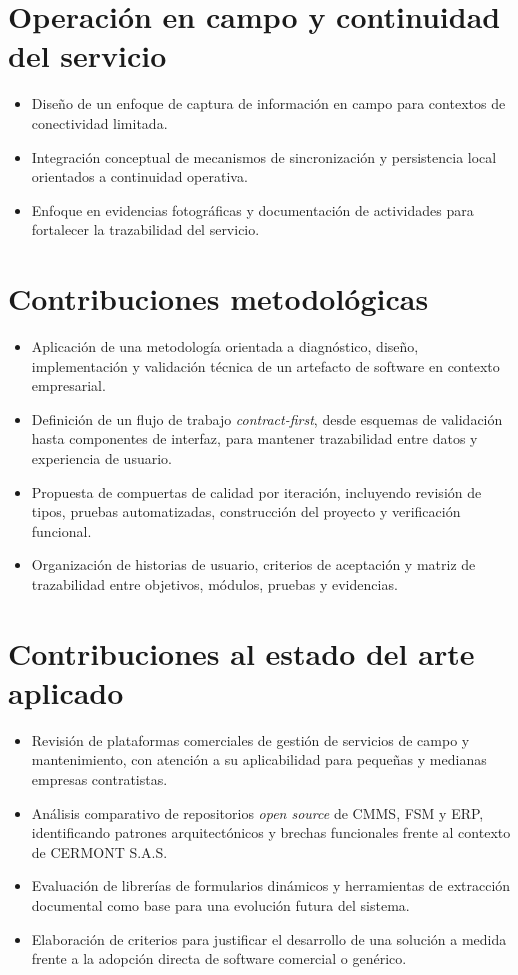 \section*{Operación en campo y continuidad del servicio}
\begin{itemize}
  \item Diseño de un enfoque de captura de información en campo para contextos de conectividad limitada.
  \item Integración conceptual de mecanismos de sincronización y persistencia local orientados a continuidad operativa.
  \item Enfoque en evidencias fotográficas y documentación de actividades para fortalecer la trazabilidad del servicio.
\end{itemize}

\section*{Contribuciones metodológicas}
\begin{itemize}
  \item Aplicación de una metodología orientada a diagnóstico, diseño, implementación y validación técnica de un artefacto de software en contexto empresarial.
  \item Definición de un flujo de trabajo \textit{contract-first}, desde esquemas de validación hasta componentes de interfaz, para mantener trazabilidad entre datos y experiencia de usuario.
  \item Propuesta de compuertas de calidad por iteración, incluyendo revisión de tipos, pruebas automatizadas, construcción del proyecto y verificación funcional.
  \item Organización de historias de usuario, criterios de aceptación y matriz de trazabilidad entre objetivos, módulos, pruebas y evidencias.
\end{itemize}

\section*{Contribuciones al estado del arte aplicado}
\begin{itemize}
  \item Revisión de plataformas comerciales de gestión de servicios de campo y mantenimiento, con atención a su aplicabilidad para pequeñas y medianas empresas contratistas.
  \item Análisis comparativo de repositorios \textit{open source} de CMMS, FSM y ERP, identificando patrones arquitectónicos y brechas funcionales frente al contexto de CERMONT S.A.S.
  \item Evaluación de librerías de formularios dinámicos y herramientas de extracción documental como base para una evolución futura del sistema.
  \item Elaboración de criterios para justificar el desarrollo de una solución a medida frente a la adopción directa de software comercial o genérico.
\end{itemize}

